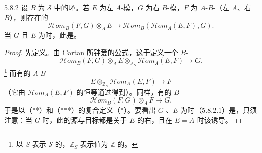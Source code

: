 \begin{SGAresult}{}{5.8.2}
设 $B$ 为 $\mathscr S$ 中的环。若 $E$ 为左 $A$-模，$G$ 为右 $B$-模，$F$ 为 $A$-$B$-（左 $A$、右 $B$），则存在的
\[\mathcal Hom_B(F,G)\otimes_A E\longrightarrow
\mathcal Hom_B(\mathcal Hom_A(E,F),G).\tag{5.8.2.1}\]
当 $G$ 且 $E$ 为时，此是。
\end{SGAresult}
\begin{proof}
先定义。由 Cartan 所钟爱的公式，这于定义一个 $B$-
\[\mathcal Hom_B(F,G)\otimes_A E\otimes_{\mathbb Z_S}\mathcal Hom_A(E,F)\longrightarrow G.\tag{*}\]
\footnote{以 $S$ 表示 $\mathscr S$ 的，$\mathbb Z_S$ 表示值为 $\mathbb Z$ 的。}
而有的 $A$-$B$-
\[E\otimes_{\mathbb Z_S}\mathcal Hom_A(E,F)\longrightarrow F\tag{**}\]
（它由 $\mathcal Hom_A(E,F)$ 的恒等通过得到）。同样，有的 $B$-
\[\mathcal Hom_B(F,G)\otimes_A F\longrightarrow G.\tag{***}\]
于是以（**）和（***）的复合定义（*）。要看出 $G$ 、$E$ 为时（5.8.2.1）是，只须注意：当 $G$ 时，此的源与目标都是关于 $E$ 的右，且在 $E=A$ 时该诱导。
\end{proof}

